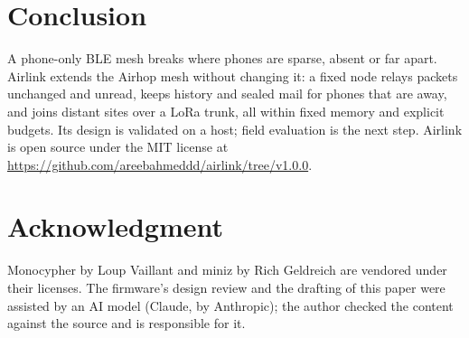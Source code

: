 \documentclass[conference]{IEEEtran}
\begin{document}
\section{Conclusion}
\label{sec:conclusion}

A phone-only BLE mesh breaks where phones are sparse, absent or far apart. Airlink extends the Airhop mesh without changing it: a fixed node relays packets unchanged and unread, keeps history and sealed mail for phones that are away, and joins distant sites over a LoRa trunk, all within fixed memory and explicit budgets. Its design is validated on a host; field evaluation is the next step. Airlink is open source under the MIT license at \url{https://github.com/areebahmeddd/airlink/tree/v1.0.0}.

\section*{Acknowledgment}
Monocypher by Loup Vaillant and miniz by Rich Geldreich are vendored under their licenses. The firmware's design review and the drafting of this paper were assisted by an AI model (Claude, by Anthropic); the author checked the content against the source and is responsible for it.



\end{document}
